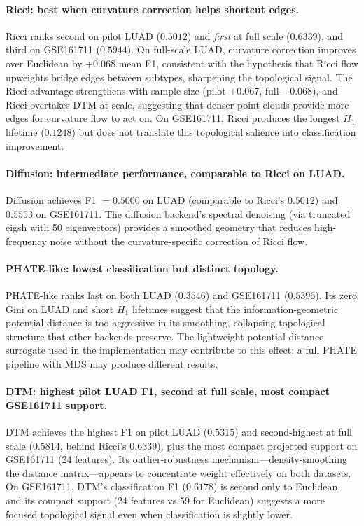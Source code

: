 \documentclass[11pt]{article}
\begin{document}
\paragraph{Ricci: best when curvature correction helps shortcut edges.}
Ricci ranks second on pilot LUAD ($0.5012$) and \emph{first} at full scale ($0.6339$), and third on GSE161711 ($0.5944$).
On full-scale LUAD, curvature correction improves over Euclidean by $+0.068$ mean F1, consistent with the hypothesis that Ricci flow upweights bridge edges between subtypes, sharpening the topological signal.
The Ricci advantage strengthens with sample size (pilot $+0.067$, full $+0.068$), and Ricci overtakes DTM at scale, suggesting that denser point clouds provide more edges for curvature flow to act on.
On GSE161711, Ricci produces the longest $H_1$ lifetime ($0.1248$) but does not translate this topological salience into classification improvement.

\paragraph{Diffusion: intermediate performance, comparable to Ricci on LUAD.}
Diffusion achieves F1 $= 0.5000$ on LUAD (comparable to Ricci's $0.5012$) and $0.5553$ on GSE161711.
The diffusion backend's spectral denoising (via truncated eigsh with 50 eigenvectors) provides a smoothed geometry that reduces high-frequency noise without the curvature-specific correction of Ricci flow.

\paragraph{PHATE-like: lowest classification but distinct topology.}
PHATE-like ranks last on both LUAD ($0.3546$) and GSE161711 ($0.5396$).
Its zero Gini on LUAD and short $H_1$ lifetimes suggest that the information-geometric potential distance is too aggressive in its smoothing, collapsing topological structure that other backends preserve.
The lightweight potential-distance surrogate used in the implementation may contribute to this effect; a full PHATE pipeline with MDS may produce different results.

\paragraph{DTM: highest pilot LUAD F1, second at full scale, most compact GSE161711 support.}
DTM achieves the highest F1 on pilot LUAD ($0.5315$) and second-highest at full scale ($0.5814$, behind Ricci's $0.6339$), plus the most compact projected support on GSE161711 (24 features).
Its outlier-robustness mechanism---density-smoothing the distance matrix---appears to concentrate weight effectively on both datasets.
On GSE161711, DTM's classification F1 ($0.6178$) is second only to Euclidean, and its compact support (24 features vs 59 for Euclidean) suggests a more focused topological signal even when classification is slightly lower.
\end{document}

